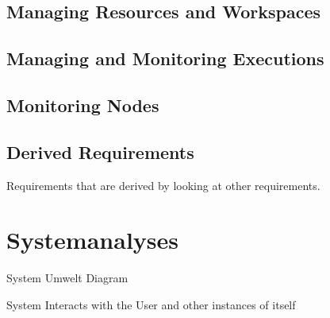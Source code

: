 \subsection{Managing Resources and Workspaces}
\begin{itemize}
\end{itemize}


\subsection{Managing and Monitoring Executions}
\begin{itemize}
\end{itemize}

\subsection{Monitoring Nodes}
\begin{itemize}
\end{itemize}

\subsection{Derived Requirements}
Requirements that are derived by looking at other requirements.

\section{Systemanalyses}
System Umwelt Diagram

System Interacts with the User and other instances of itself

